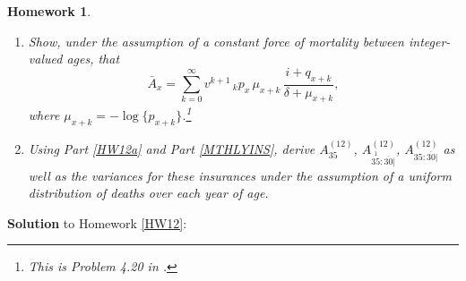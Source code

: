 \documentclass[11pt,fleqn,oneside]{book}
\newtheorem{homework}{Homework}
\begin{document}
\begin{homework}
\begin{enumerate}
\begin{enumerate}
\item What is the present-value random variable for this insurance?
\item Set up a recursion relationship for the actuarial present value, $A_x^{(m)}$, for this insurance.
\item Show algebraically that, under the assumption of a uniform distribution of deaths over the insurance year of age,
$$
A_x^{(m)} = \frac{i}{i^{(m)}}\,A_x.
$$
\end{enumerate}
\item Show, under the assumption of a constant force of mortality between integer-valued ages, that
$$
\bar{A}_x = \sum_{k=0}^{\infty} v^{k+1}\,{_kp_x}\,\mu_{x+k}\,\frac{i+q_{x+k}}{\delta + \mu_{x+k}},
$$
where $\mu_{x+k} = - \log\{p_{x+k}\}$.\footnote{This is Problem 4.20 in \cite{BOWERS}.} 
\item Using Part \ref{HW12a} and Part \ref{MTHLYINS}, derive ${A^{(12)}_{35}}$,
${A^{(12)}_{\stackrel{1}{35}:\overline{30}|}}$, 
${A^{(12)}_{35:\overline{30}|}}$ as well as the variances for these insurances under the assumption of a uniform distribution of deaths over each year of age.
\end{enumerate}
\end{homework}
\noindent \textbf{Solution} to Homework \ref{HW12}:
\footnotesize
\end{document}
